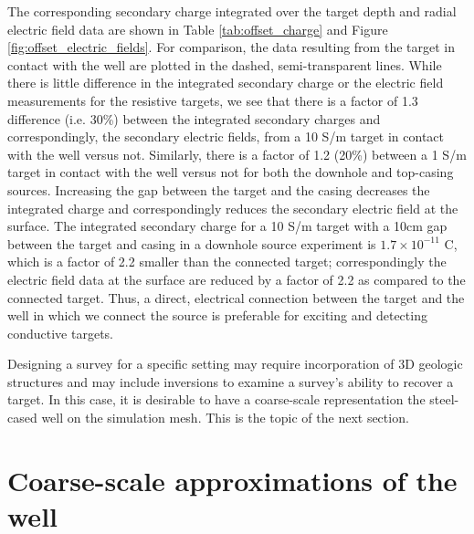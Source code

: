 \documentclass[extra,mreferee]{gji}
\begin{document}
The corresponding secondary charge integrated over the target depth and radial electric field data are shown in Table \ref{tab:offset_charge} and Figure \ref{fig:offset_electric_fields}. For comparison, the data resulting from the target in contact with the well are plotted in the dashed, semi-transparent lines. While there is little difference in the integrated secondary charge or the electric field measurements for the resistive targets, we see that there is a factor of 1.3 difference (i.e. 30\%) between the integrated secondary charges and correspondingly, the secondary electric fields, from a 10 S/m target in contact with the well versus not. Similarly, there is a factor of 1.2 (20\%) between a 1 S/m target in contact with the well versus not for both the downhole and top-casing sources. Increasing the gap between the target and the casing decreases the integrated charge and correspondingly reduces the secondary electric field at the surface. The integrated secondary charge for a 10 S/m target with a 10cm gap between the target and casing in a downhole source experiment is $1.7 \times 10^{-11}$ C, which is a factor of 2.2 smaller than the connected target; correspondingly the electric field data at the surface are reduced by a factor of 2.2 as compared to the connected target. Thus, a direct, electrical connection between the target and the well in which we connect the source is preferable for exciting and detecting conductive targets.





Designing a survey for a specific setting may require incorporation of 3D geologic structures and may include inversions to examine a survey's ability to recover a target. In this case, it is desirable to have a coarse-scale representation the steel-cased well on the simulation mesh. This is the topic of the next section.


\section{Coarse-scale approximations of the well}
\label{sec:approximating_wells}
\end{document}
